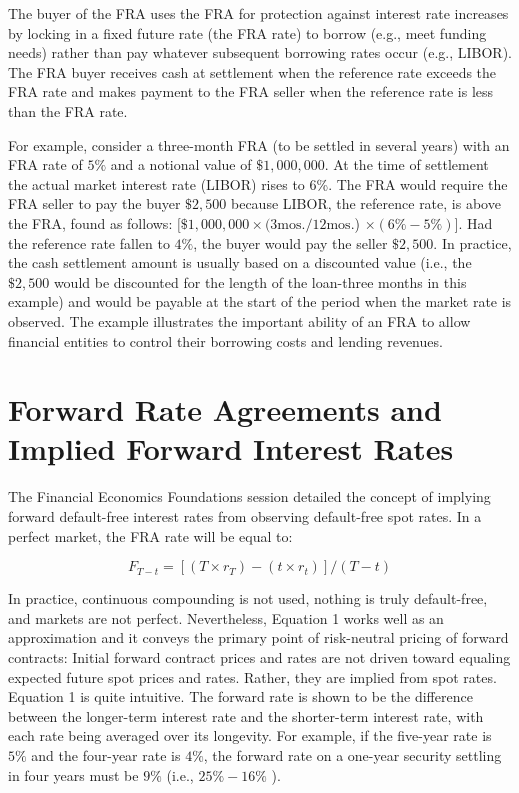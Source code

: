 \documentclass[11pt]{article}
\begin{document}
The buyer of the FRA uses the FRA for protection against interest rate increases by locking in a fixed future rate (the FRA rate) to borrow (e.g., meet funding needs) rather than pay whatever subsequent borrowing rates occur (e.g., LIBOR). The FRA buyer receives cash at settlement when the reference rate exceeds the FRA rate and makes payment to the FRA seller when the reference rate is less than the FRA rate.

For example, consider a three-month FRA (to be settled in several years) with an FRA rate of $5 \%$ and a notional value of $\$ 1,000,000$. At the time of settlement the actual market interest rate (LIBOR) rises to 6\%. The FRA would require the FRA seller to pay the buyer $\$ 2,500$ because LIBOR, the reference rate, is above the FRA, found as follows: $[\$ 1,000,000 \times(3 \mathrm{mos} . / 12 \mathrm{mos}$.) $\times(6 \%-5 \%)]$. Had the reference rate fallen to $4 \%$, the buyer would pay the seller $\$ 2,500$. In practice, the cash settlement amount is usually based on a discounted value (i.e., the $\$ 2,500$ would be discounted for the length of the loan-three months in this example) and would be payable at the start of the period when the market rate is observed. The example illustrates the important ability of an FRA to allow financial entities to control their borrowing costs and lending revenues.

\section*{Forward Rate Agreements and Implied Forward Interest Rates}
The Financial Economics Foundations session detailed the concept of implying forward default-free interest rates from observing default-free spot rates. In a perfect market, the FRA rate will be equal to:


\begin{equation*}
F_{T-t}=\left[\left(T \times r_{T}\right)-\left(t \times r_{t}\right)\right] /(T-t) \tag{1}
\end{equation*}


In practice, continuous compounding is not used, nothing is truly default-free, and markets are not perfect. Nevertheless, Equation 1 works well as an approximation and it conveys the primary point of risk-neutral pricing of forward contracts: Initial forward contract prices and rates are not driven toward equaling expected future spot prices and rates. Rather, they are implied from spot rates. Equation 1 is quite intuitive. The forward rate is shown to be the difference between the longer-term interest rate and the shorter-term interest rate, with each rate being averaged over its longevity. For example, if the five-year rate is $5 \%$ and the four-year rate is $4 \%$, the forward rate on a one-year security settling in four years must be $9 \%$ (i.e., $25 \%-16 \%$ ).
\end{document}
